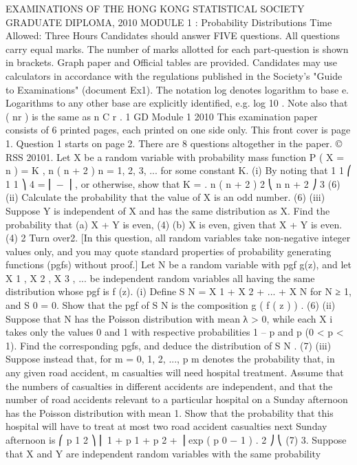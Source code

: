 EXAMINATIONS OF THE HONG KONG STATISTICAL SOCIETY
GRADUATE DIPLOMA, 2010
MODULE 1 : Probability Distributions
Time Allowed: Three Hours
Candidates should answer FIVE questions.
All questions carry equal marks.
The number of marks allotted for each part-question is shown in brackets.
Graph paper and Official tables are provided.
Candidates may use calculators in accordance with the regulations published in
the Society's "Guide to Examinations" (document Ex1).
The notation log denotes logarithm to base e.
Logarithms to any other base are explicitly identified, e.g. log 10 .
Note also that
( nr ) is the same as
n
C r .
1
GD Module 1 2010
This examination paper consists of 6 printed pages, each printed on one side only.
This front cover is page 1.
Question 1 starts on page 2.
There are 8 questions altogether in the paper.
© RSS 20101.
Let X be a random variable with probability mass function
P ( X = n ) =
K
,
n ( n + 2 )
n = 1, 2, 3, ...
for some constant K.
(i)
By noting that
1
1 ⎛ 1
1 ⎞
4
= ⎜ −
⎟ , or otherwise, show that K = .
n ( n + 2 ) 2 ⎝ n n + 2 ⎠
3
(6)
(ii)
Calculate the probability that the value of X is an odd number.
(6)
(iii)
Suppose Y is independent of X and has the same distribution as X. Find the
probability that
(a)
X + Y is even,
(4)
(b)
X is even, given that X + Y is even.
(4)
2
Turn over2.
[In this question, all random variables take non-negative integer values only, and you
may quote standard properties of probability generating functions (pgfs) without
proof.]
Let N be a random variable with pgf g(z), and let X 1 , X 2 , X 3 , ... be independent random
variables all having the same distribution whose pgf is f (z).
(i)
Define S N = X 1 + X 2 + ... + X N for N ≥ 1, and S 0 = 0. Show that the pgf of S N
is the composition g ( f ( z ) ) .
(6)
(ii) Suppose that N has the Poisson distribution with mean λ > 0, while each X i
takes only the values 0 and 1 with respective probabilities 1 – p and p
(0 < p < 1). Find the corresponding pgfs, and deduce the distribution of S N .
(7)
(iii) Suppose instead that, for m = 0, 1, 2, ..., p m denotes the probability that, in any
given road accident, m casualties will need hospital treatment. Assume that the
numbers of casualties in different accidents are independent, and that the
number of road accidents relevant to a particular hospital on a Sunday
afternoon has the Poisson distribution with mean 1. Show that the probability
that this hospital will have to treat at most two road accident casualties next
Sunday afternoon is
⎛
p 1 2 ⎞
⎜ 1 + p 1 + p 2 +
⎟ exp ( p 0 − 1 ) .
2 ⎠
⎝
(7)
3.
Suppose that X and Y are independent random variables with the same probability
